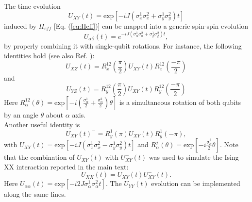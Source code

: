 \documentclass[aps,twocolumn,groupedaddress,superscriptaddress,floatfix,amsmath,amssymb,prb]{revtex4-1}
\begin{document}
The time evolution \begin{equation}
U_{XY}(t)= \text{exp} \left[-i J \left( \sigma^1_x\sigma^2_x +\sigma^1_y\sigma^2_y \right)  t \right]
\end{equation}
induced by $H_{eff}$ [Eq. (\ref{eq:Heff})] can be mapped into a generic spin-spin evolution
\begin{equation}
U_{\alpha\beta} (t) = e^{-i J \left( \sigma_{\alpha}^1 \sigma_{\alpha}^2  +  \sigma_{\beta}^1 \sigma_{\beta}^2\right)t},
\end{equation}
by properly combining it with single-qubit rotations. 
For instance, the following identities hold (see also Ref. ):
\begin{equation}
U_{XZ}(t) = R_x^{12}\left(\frac{\pi}{2}\right) U_{XY}(t) R_x^{12}\left(\frac{-\pi}{2}\right)  
\end{equation}
and
\begin{equation}
U_{YZ}(t) = R_y^{12}\left(\frac{\pi}{2}\right) U_{XY}(t) R_y^{12}\left(\frac{-\pi}{2}\right)  
\end{equation}
Here $R_\alpha^{12} (\theta) = \text{exp}\left[-i\left(  \frac{\sigma_{\alpha}^1}{2}+\frac{\sigma_{\alpha}^2}{2} \right) \theta \right] $ is a simultaneous rotation of both qubits by an angle $\theta$ about $\alpha$ axis. \\
Another useful identity is
\begin{equation}
U_{XY}(t)^- = R_y^{1}\left(\pi\right) U_{XY}(t) R_y^{1}\left(-\pi\right)  ,
\end{equation}
with $U_{XY}^-(t) = \text{exp} \left[-i J \left( \sigma_{x}^1 \sigma_{x}^2  -  \sigma_{y}^1 \sigma_{y}^2\right)t \right] $ and $R_\alpha^{j} (\theta) = \text{exp}\left[-i  \frac{\sigma_{\alpha}^j}{2} \theta \right] $.
Note that the combination of $U_{XY}(t)$ with $U_{XY}^-(t)$ was used to simulate the Ising XX interaction reported in the main text:
\begin{equation}
U_{XX}(t) = U_{XY}(t) U_{XY}^-(t) .
\label{eq:XX}
\end{equation}
Here $U_{\alpha\alpha}(t) = \text{exp} \left[-i 2J \sigma_{\alpha}^1 \sigma_{\alpha}^2  t \right] $. The $U_{YY}(t)$ evolution can be implemented along the same lines. \\
\end{document}
